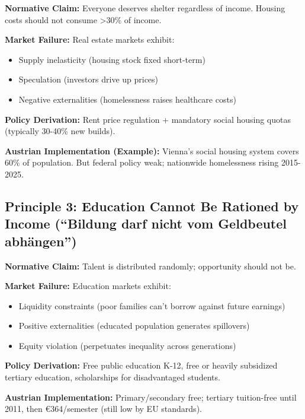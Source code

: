 \begin{tcolorbox}[colback=gray!5!white, colframe=gray!75!black,
    title=Principle BF-2: Housing as Right]

\textbf{Normative Claim:} Everyone deserves shelter regardless of income. Housing costs should not consume >30\% of income.

\textbf{Market Failure:} Real estate markets exhibit:
\begin{itemize}[nosep]
\item Supply inelasticity (housing stock fixed short-term)
\item Speculation (investors drive up prices)
\item Negative externalities (homelessness raises healthcare costs)
\end{itemize}

\textbf{Policy Derivation:} Rent price regulation + mandatory social housing quotas (typically 30-40\% new builds).

\textbf{Austrian Implementation (Example):} Vienna's social housing system covers 60\% of population. But federal policy weak; nationwide homelessness rising 2015-2025.

\end{tcolorbox}


\subsection{Principle 3: Education Cannot Be Rationed by Income (``Bildung darf nicht vom Geldbeutel abhängen'')}

\begin{tcolorbox}[colback=gray!5!white, colframe=gray!75!black,
    title=Principle BF-3: Education Universality]

\textbf{Normative Claim:} Talent is distributed randomly; opportunity should not be.

\textbf{Market Failure:} Education markets exhibit:
\begin{itemize}[nosep]
\item Liquidity constraints (poor families can't borrow against future earnings)
\item Positive externalities (educated population generates spillovers)
\item Equity violation (perpetuates inequality across generations)
\end{itemize}

\textbf{Policy Derivation:} Free public education K-12, free or heavily subsidized tertiary education, scholarships for disadvantaged students.

\textbf{Austrian Implementation:} Primary/secondary free; tertiary tuition-free until 2011, then €364/semester (still low by EU standards).

\end{tcolorbox}

